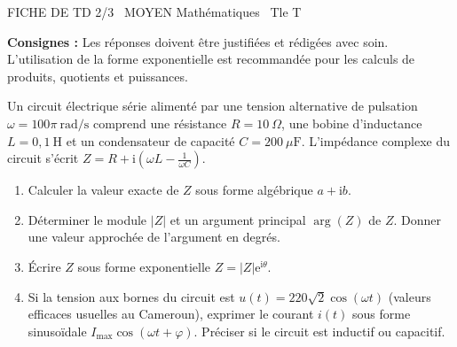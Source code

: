 \documentclass[11pt]{article}
\begin{document}
\begin{tcolorbox}[enhanced,colback=popink,colframe=popink,arc=10pt,boxrule=0pt,left=12pt,right=12pt,top=9pt,bottom=9pt]
{\color{white}\popxbold\small FICHE DE TD 2/3 \textbullet\ MOYEN \hfill Mathématiques \textbullet\ Tle T\par}
\end{tcolorbox}
\vspace{4pt}
\noindent\textbf{Consignes :} Les réponses doivent être justifiées et rédigées avec soin. L'utilisation de la forme exponentielle est recommandée pour les calculs de produits, quotients et puissances.

\begin{exercice}
Un circuit électrique série alimenté par une tension alternative de pulsation $\omega = 100\pi~\text{rad/s}$ comprend une résistance $R = 10~\Omega$, une bobine d'inductance $L = 0,1~\text{H}$ et un condensateur de capacité $C = 200~\mu\text{F}$.
L'impédance complexe du circuit s'écrit $Z = R + \mathrm{i}\left(\omega L - \frac{1}{\omega C}\right)$.
\begin{enumerate}
    \item Calculer la valeur exacte de $Z$ sous forme algébrique $a + \mathrm{i}b$.
    \item Déterminer le module $|Z|$ et un argument principal $\arg(Z)$ de $Z$. Donner une valeur approchée de l'argument en degrés.
    \item Écrire $Z$ sous forme exponentielle $Z = |Z| \mathrm{e}^{\mathrm{i}\theta}$.
    \item Si la tension aux bornes du circuit est $u(t) = 220\sqrt{2}\cos(\omega t)$ (valeurs efficaces usuelles au Cameroun), exprimer le courant $i(t)$ sous forme sinusoïdale $I_{\text{max}}\cos(\omega t + \varphi)$. Préciser si le circuit est inductif ou capacitif.
\end{enumerate}
\end{exercice}
\end{document}
